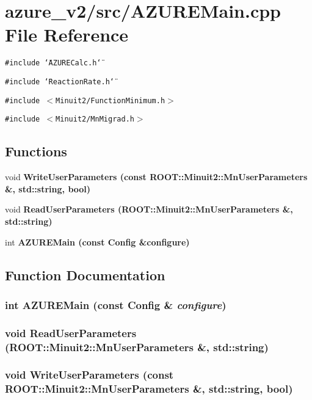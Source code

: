 \section{azure\_\-v2/src/AZUREMain.cpp File Reference}
\label{AZUREMain_8cpp}
{\tt \#include \char`\"{}AZURECalc.h\char`\"{}}\par
{\tt \#include \char`\"{}Reaction\-Rate.h\char`\"{}}\par
{\tt \#include $<$Minuit2/Function\-Minimum.h$>$}\par
{\tt \#include $<$Minuit2/Mn\-Migrad.h$>$}\par
\subsection*{Functions}
\begin{CompactItemize}
\item 
void \bf{Write\-User\-Parameters} (const ROOT::Minuit2::Mn\-User\-Parameters \&, std::string, bool)
\item 
void \bf{Read\-User\-Parameters} (ROOT::Minuit2::Mn\-User\-Parameters \&, std::string)
\item 
int \bf{AZUREMain} (const \bf{Config} \&configure)
\end{CompactItemize}


\subsection{Function Documentation}
\subsubsection{\setlength{\rightskip}{0pt plus 5cm}int AZUREMain (const \bf{Config} \& {\em configure})}\label{AZUREMain_8cpp_28b684cc117634cf4d0914279a664932}


\subsubsection{\setlength{\rightskip}{0pt plus 5cm}void Read\-User\-Parameters (ROOT::Minuit2::Mn\-User\-Parameters \&, std::string)}\label{AZUREMain_8cpp_03d007fb1f30b5dbd29defdf2becb59a}


\subsubsection{\setlength{\rightskip}{0pt plus 5cm}void Write\-User\-Parameters (const ROOT::Minuit2::Mn\-User\-Parameters \&, std::string, bool)}\label{AZUREMain_8cpp_cfaafec8381bde369ff3bdddd36184c8}


